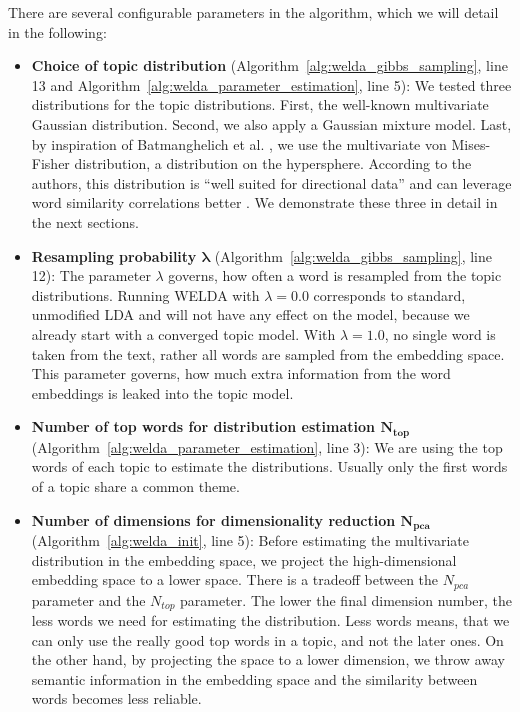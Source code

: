 \documentclass[
        a4paper,
        titlepage,
        twoside,
        parskip
        ]{scrbook}
\theoremstyle{break}
\begin{document}
There are several configurable parameters in the algorithm, which we will detail in the following:
\begin{itemize}
  \item \textbf{Choice of topic distribution} (Algorithm~\ref{alg:welda_gibbs_sampling}, line 13 and Algorithm~\ref{alg:welda_parameter_estimation}, line 5):
    We tested three distributions for the topic distributions.
    First, the well-known multivariate Gaussian distribution.
    Second, we also apply a Gaussian mixture model.
    Last, by inspiration of Batmanghelich et al. \cite{Batmanghelich2016}, we use the multivariate von Mises-Fisher distribution, a distribution on the hypersphere.
    According to the authors, this distribution is ``well suited for directional data'' and can leverage word similarity correlations better \cite{Batmanghelich2016}.
    We demonstrate these three in detail in the next sections.
  \item \textbf{Resampling probability $\boldsymbol{\lambda}$} (Algorithm~\ref{alg:welda_gibbs_sampling}, line 12):
    The parameter $\lambda$ governs, how often a word is resampled from the topic distributions.
    Running WELDA with $\lambda = 0.0$ corresponds to standard, unmodified LDA and will not have any effect on the model, because we already start with a converged topic model.
    With $\lambda = 1.0$, no single word is taken from the text, rather all words are sampled from the embedding space.
    This parameter governs, how much extra information from the word embeddings is leaked into the topic model.
  \item \textbf{Number of top words for distribution estimation $\boldsymbol{N_{top}}$} (Algorithm~\ref{alg:welda_parameter_estimation}, line 3):
    We are using the top words of each topic to estimate the distributions.
    Usually only the first words of a topic share a common theme.
  \item \textbf{Number of dimensions for dimensionality reduction $\boldsymbol{N_{pca}}$} (Algorithm~\ref{alg:welda_init}, line 5):
    Before estimating the multivariate distribution in the embedding space, we project the high-dimensional embedding space to a lower space.
    There is a tradeoff between the $N_{pca}$ parameter and the $N_{top}$ parameter.
    The lower the final dimension number, the less words we need for estimating the distribution.
    Less words means, that we can only use the really good top words in a topic, and not the later ones.
    On the other hand, by projecting the space to a lower dimension, we throw away semantic information in the embedding space and the similarity between words becomes less reliable.

\end{itemize}
\end{document}
